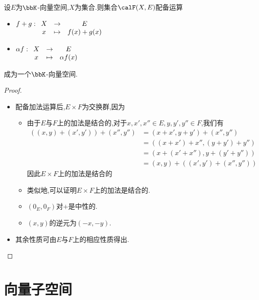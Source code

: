 \begin{prop}
    设$E$为$\bbK$-向量空间,$X$为集合.则集合$\calF(X, E)$配备运算

    \begin{itemize}
        \item $f + g: \begin{array}[t]{ccc} X & \to & E \\ x & \mapsto & f(x) + g(x) \end{array}$
        \item $\alpha f: \begin{array}[t]{ccc} X & \to & E \\ x & \mapsto & \alpha f(x) \end{array}$
    \end{itemize}

    成为一个$\bbK$-向量空间.
\end{prop}

\begin{proof} $\ $
    \begin{itemize}
        \item 配备加法运算后,$E \times F$为交换群,因为
            \begin{itemize}
                \item 由于$E$与$F$上的加法是结合的,对于$x, x', x'' \in E, y, y', y'' \in F$,我们有
                    \begin{align*}
                        ((x, y) + (x', y')) +(x'', y'') & = (x + x', y + y') + (x'', y'') \\
                        & = ((x + x') + x'', (y + y') + y'') \\
                        & = (x + (x' + x''), y + (y' + y'')) \\
                        & = (x, y) + ((x', y') + (x'', y''))
                    \end{align*}
                    因此$E \times F$上的加法是结合的
                \item 类似地,可以证明$E \times F$上的加法是结合的.
                \item $(0_E, 0_F)$对$+$是中性的.
                \item $(x, y)$的逆元为$(-x, -y)$.
            \end{itemize}
        \item 其余性质可由$E$与$F$上的相应性质得出.
    \end{itemize}
\end{proof}

\section{向量子空间}

